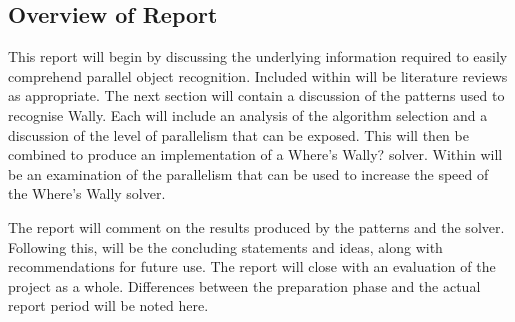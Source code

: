 \documentclass[../main.tex]{subfiles}
\begin{document}
    \subsection{Overview of Report}
    This report will begin by discussing the underlying information required to easily comprehend parallel object recognition.
    Included within will be literature reviews as appropriate.
    The next section will contain a discussion of the patterns used to recognise Wally.
    Each will include an analysis of the algorithm selection and a discussion of the level of parallelism that can be exposed.
    This will then be combined to produce an implementation of a Where's Wally? solver.
    Within will be an examination of the parallelism that can be used to increase the speed of the Where's Wally solver.
    
    The report will comment on the results produced by the patterns and the solver.
    Following this, will be the concluding statements and ideas, along with recommendations for future use.
    The report will close with an evaluation of the project as a whole.
    Differences between the preparation phase and the actual report period will be noted here.
\end{document}
